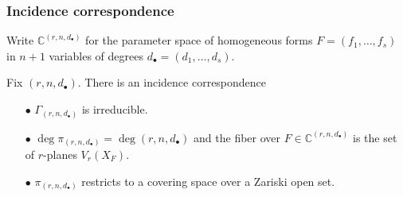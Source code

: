\documentclass{beamer}
\theoremstyle{definition}
\begin{document}
\begin{frame}
\frametitle{Incidence correspondence}
Write $\mathbb{C}^{(r,n,d_\bullet)}$ for the parameter space of homogeneous forms $F = (f_1,\dotsc,f_s)$ in $n+1$ variables of degrees $d_\bullet = (d_1,\dotsc,d_s)$.

Fix $(r,n,d_\bullet)$. There is an incidence correspondence

\vspace{-.3cm}

\begin{center}
\end{center}

\vspace{-.45cm}

\begin{enumerate}
\item[$\bullet$] $\Gamma_{(r,n,d_\bullet)}$ is irreducible.

\item[$\bullet$] $\deg \pi_{(r,n,d_\bullet)} = \deg(r,n,d_\bullet)$ and the fiber over $F\in\mathbb{C}^{(r,n,d_\bullet)}$ is the set of $r$-planes $V_r(X_F)$.

\item[$\bullet$] $\pi_{(r,n,d_\bullet)}$ restricts to a covering space over a Zariski open set.
\end{enumerate}
\end{frame}
\end{document}
